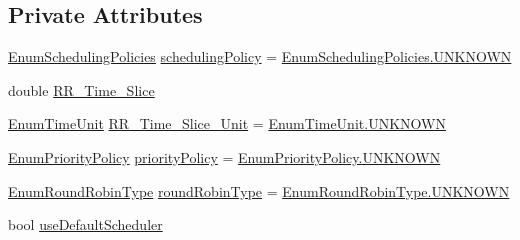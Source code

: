 \subsection*{Private Attributes}
\begin{DoxyCompactItemize}
\item 
\hyperlink{namespace_c_p_u___o_s___simulator_1_1_operating___system_ad0cdaacf9652394d23fa29109640fe08}{Enum\+Scheduling\+Policies} \hyperlink{class_c_p_u___o_s___simulator_1_1_operating___system_1_1_o_s_core_a379d53a0d661ac56f75c2676bed68b06}{scheduling\+Policy} = \hyperlink{namespace_c_p_u___o_s___simulator_1_1_operating___system_a03a98a403abc737c106a8f92db5bffc1a696b031073e74bf2cb98e5ef201d4aa3}{Enum\+Scheduling\+Policies.\+U\+N\+K\+N\+O\+W\+N}
\item 
double \hyperlink{class_c_p_u___o_s___simulator_1_1_operating___system_1_1_o_s_core_a34a8be2fd9187764366ca5a7b48d764e}{R\+R\+\_\+\+Time\+\_\+\+Slice}
\item 
\hyperlink{namespace_c_p_u___o_s___simulator_1_1_operating___system_a0553d0bc2513aec52caa769acf994d5c}{Enum\+Time\+Unit} \hyperlink{class_c_p_u___o_s___simulator_1_1_operating___system_1_1_o_s_core_ac0f4c6d450108d3b51e9fc7f9dc930ce}{R\+R\+\_\+\+Time\+\_\+\+Slice\+\_\+\+Unit} = \hyperlink{namespace_c_p_u___o_s___simulator_1_1_operating___system_a03a98a403abc737c106a8f92db5bffc1a696b031073e74bf2cb98e5ef201d4aa3}{Enum\+Time\+Unit.\+U\+N\+K\+N\+O\+W\+N}
\item 
\hyperlink{namespace_c_p_u___o_s___simulator_1_1_operating___system_a3a9286a473bd079e9c65908c0378fa00}{Enum\+Priority\+Policy} \hyperlink{class_c_p_u___o_s___simulator_1_1_operating___system_1_1_o_s_core_a866fa4ff3b8aadb3eb57188f6a87e148}{priority\+Policy} = \hyperlink{namespace_c_p_u___o_s___simulator_1_1_operating___system_a03a98a403abc737c106a8f92db5bffc1a696b031073e74bf2cb98e5ef201d4aa3}{Enum\+Priority\+Policy.\+U\+N\+K\+N\+O\+W\+N}
\item 
\hyperlink{namespace_c_p_u___o_s___simulator_1_1_operating___system_a4c7effb8b6725df52018a3a14cede96e}{Enum\+Round\+Robin\+Type} \hyperlink{class_c_p_u___o_s___simulator_1_1_operating___system_1_1_o_s_core_a4a891b4c9ed3aa97c389bccab0b2687d}{round\+Robin\+Type} = \hyperlink{namespace_c_p_u___o_s___simulator_1_1_operating___system_a03a98a403abc737c106a8f92db5bffc1a696b031073e74bf2cb98e5ef201d4aa3}{Enum\+Round\+Robin\+Type.\+U\+N\+K\+N\+O\+W\+N}
\item 
bool \hyperlink{class_c_p_u___o_s___simulator_1_1_operating___system_1_1_o_s_core_a9e4390ec19f02a66b2c8ba829fad0e49}{use\+Default\+Scheduler}

\end{DoxyCompactItemize}
